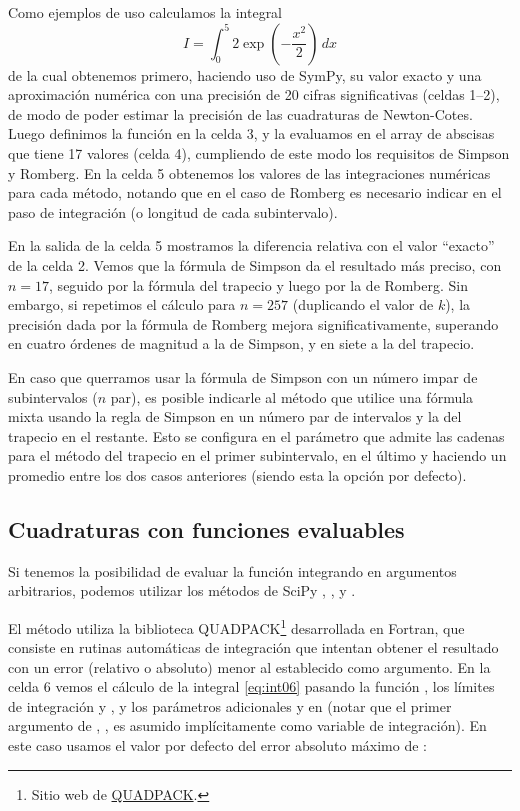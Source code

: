 Como ejemplos de uso calculamos la integral
\begin{equation}\label{eq:int06}
 I = \int_0^5 2 \exp\left( -\frac{x^2}{2} \right) \, dx
\end{equation}
de la cual obtenemos primero, haciendo uso de SymPy, su valor exacto y una aproximación numérica con una precisión de 20 cifras significativas (celdas 1--2), de modo de poder estimar la precisión de las cuadraturas de Newton-Cotes. Luego definimos la función en la celda 3, y la evaluamos en el array de abscisas  que tiene 17 valores (celda 4), cumpliendo de este modo los requisitos de Simpson y Romberg. En la celda 5 obtenemos los valores de las integraciones numéricas para cada método, notando que en el caso de Romberg es necesario indicar en  el paso de integración (o longitud de cada subintervalo).

En la salida de la celda 5 mostramos la diferencia relativa con el valor ``exacto'' de la celda 2. Vemos que la fórmula de Simpson da el resultado más preciso, con $n = 17$, seguido por la fórmula del trapecio y luego por la de Romberg. Sin embargo, si repetimos el cálculo para $n = 257$ (duplicando el valor de $k$), la precisión dada por la fórmula de Romberg mejora significativamente, superando en cuatro órdenes de magnitud a la de Simpson, y en siete a la del trapecio.

En caso que querramos usar la fórmula de Simpson con un número impar de subintervalos ($n$ par), es posible indicarle al método  que utilice una fórmula mixta usando la regla de Simpson en un número par de intervalos y la del trapecio en el restante. Esto se configura en el parámetro  que admite las cadenas  para el método del trapecio en el primer subintervalo,  en el último y  haciendo un promedio entre los dos casos anteriores (siendo esta la opción por defecto).

\subsection{Cuadraturas con funciones evaluables}\label{sec:cuadfuneval}
Si tenemos la posibilidad de evaluar la función integrando en argumentos arbitrarios, podemos utilizar los métodos de SciPy , ,  y .

El método  utiliza la biblioteca QUADPACK\footnote{Sitio web de \href{https://nines.cs.kuleuven.be/software/QUADPACK/}{QUADPACK}.} desarrollada en Fortran, que consiste en rutinas automáticas de integración que intentan obtener el resultado con un error (relativo o absoluto) menor al establecido como argumento. En la celda 6 vemos el cálculo de la integral \eqref{eq:int06} pasando la función , los límites de integración  y , y los parámetros adicionales  y  en  (notar que el primer argumento de , , es asumido implícitamente como variable de integración). En este caso usamos el valor por defecto del error absoluto máximo  de :

